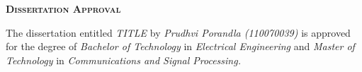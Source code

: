
\newpage

\thispagestyle{empty}
\begin{center}
  \begin{Huge}
    \textsc{\textbf{Dissertation Approval}}
  \end{Huge}
\end{center}

\vspace{0.2in}

 The dissertation entitled \textit{TITLE} by \textit{Prudhvi Porandla (110070039)} is approved for the degree of \textit{Bachelor of Technology} in \textit{Electrical Engineering} and \textit{Master of Technology} in \textit{Communications and Signal Processing.}


\vspace{0.1in}

